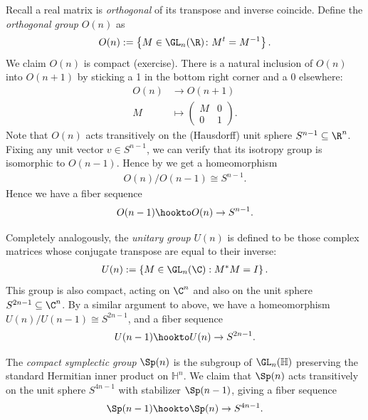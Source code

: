 \documentclass[11pt]{book}
\begin{document}
\begin{example}
Recall a real matrix is \emph{orthogonal} of its transpose and inverse coincide. Define the \emph{orthogonal group} $O(n)$ as
\begin{align*}
    O(n) := \left\{ M \in \GL_n(\R) \colon M^t = M^{-1} \right\}.
\end{align*}
We claim $O(n)$ is compact (exercise). There is a natural inclusion of $O(n)$ into $O(n+1)$ by sticking a 1 in the bottom right corner and a 0 elsewhere:
\begin{align*}
    O(n) &\to O(n+1) \\
    M &\mapsto \begin{pmatrix} M & 0 \\ 0 & 1 \end{pmatrix}.
\end{align*}
Note that $O(n)$ acts transitively on the (Hausdorff) unit sphere $S^{n-1} \subseteq \R^n$. Fixing any unit vector $v\in S^{n-1}$, we can verify that its isotropy group is isomorphic to $O(n-1)$. Hence by  we get a homeomorphism
\begin{align*}
    O(n)/O(n-1) \cong S^{n-1}.
\end{align*}
Hence we have a fiber sequence
\begin{align*}
    O(n-1) \hookto O(n) \to S^{n-1}.
\end{align*}
\end{example}

\begin{example} Completely analogously, the \emph{unitary group} $U(n)$ is defined to be those complex matrices whose conjugate transpose are equal to their inverse:
\begin{align*}
    U(n) := \left\{ M\in \GL_n(\C) : M^\ast M = I \right\}.
\end{align*}
This group is also compact, acting on $\C^n$ and also on the unit sphere $S^{2n-1} \subseteq \C^n$. By a similar argument to above, we have a homeomorphism $U(n)/U(n-1) \cong S^{2n-1}$, and a fiber sequence
\begin{align*}
    U(n-1) \hookto U(n) \to S^{2n-1}.
\end{align*}
\end{example}

\begin{example} The \emph{compact symplectic group} $\Sp(n)$ is the subgroup of $\GL_n(\mathbb{H})$ preserving the standard Hermitian inner product on $\mathbb{H}^n$. We claim that $\Sp(n)$ acts transitively on the unit sphere $S^{4n-1}$ with stabilizer $\Sp(n-1)$, giving a fiber sequence
\begin{align*}
    \Sp(n-1) \hookto \Sp(n) \to S^{4n-1}.
\end{align*}
\end{example}
\end{document}
